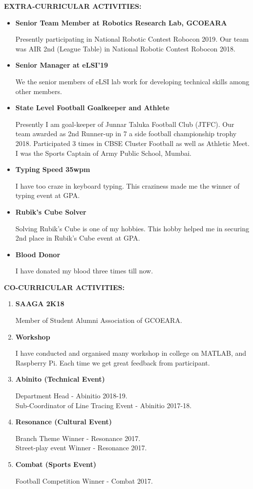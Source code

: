 \documentclass[a4paper, 10pt]{article}
\begin{document}
{\textbf{\Large{EXTRA-CURRICULAR ACTIVITIES:}}}
\begin{itemize}
\item \textbf{Senior Team Member at Robotics Research Lab, GCOEARA}

Presently participating in National Robotic Contest Robocon 2019$.$ Our team was AIR 2nd (League Table) in National Robotic Contest Robocon 2018.
\item \textbf{Senior Manager at eLSI'19}

We the senior members of eLSI lab work for developing technical skills among other members.
\item \textbf{State Level Football Goalkeeper and Athlete}

Presently I am goal-keeper of Junnar Taluka Football Club (JTFC)$.$ Our team awarded as 2nd Runner-up in 7 a side football championship trophy 2018$.$ Participated 3 times in CBSE Cluster Football as well as Athletic Meet$.$ I was the Sports Captain of Army Public School, Mumbai. 
\item \textbf{Typing Speed 35wpm}

I have too craze in keyboard typing$.$ This craziness made me the winner of typing event at GPA.
\item \textbf{Rubik's Cube Solver}

Solving Rubik's Cube is one of my hobbies$.$ This hobby helped me in securing 2nd place in Rubik's Cube event at GPA.
\item \textbf{Blood Donor}

I have donated my blood three times till now.\\
\end{itemize}

{\textbf{\Large{CO-CURRICULAR ACTIVITIES:}}}
\begin{enumerate}
\item \textbf{SAAGA 2K18}

Member of Student Alumni Association of GCOEARA.
\item \textbf{Workshop}

I have conducted and organised many workshop in college on MATLAB, and Raspberry Pi. Each time we get great feedback from participant.
\item \textbf{Abinito (Technical Event)}

Department Head - Abinitio 2018-19.\\
Sub-Coordinator of Line Tracing Event - Abinitio 2017-18. 
\item \textbf{Resonance (Cultural Event)} 

Branch Theme Winner - Resonance 2017. \\
Street-play event Winner - Resonance 2017.
\item \textbf{Combat (Sports Event)}

Football Competition Winner - Combat 2017. \\
\end{enumerate}
\end{document}
